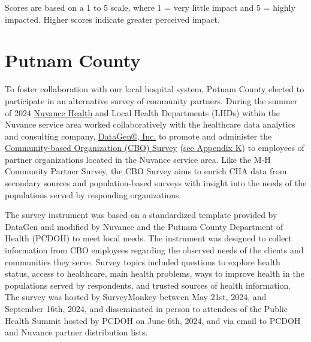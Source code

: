 \documentclass[
  english,
  letterpaper,
]{report}
\begin{document}
\begin{tcolorbox}[enhanced jigsaw, breakable, leftrule=.75mm, title=\textcolor{quarto-callout-note-color}{\faInfo}\hspace{0.5em}{Note}, bottomrule=.15mm, opacityback=0, left=2mm, colback=white, bottomtitle=1mm, coltitle=black, colbacktitle=quarto-callout-note-color!10!white, colframe=quarto-callout-note-color-frame, opacitybacktitle=0.6, toptitle=1mm, titlerule=0mm, arc=.35mm, rightrule=.15mm, toprule=.15mm]

Scores are based on a 1 to 5 scale, where 1 = very little impact and 5 =
highly impacted. Higher scores indicate greater perceived impact.

\end{tcolorbox}

\section{Putnam County}\label{putnam-county-2}

To foster collaboration with our local hospital system, Putnam County
elected to participate in an alternative survey of community partners.
During the summer of 2024 \href{https://www.nuvancehealth.org/}{Nuvance
Health} and Local Health Departments (LHDs) within the Nuvance service
area worked collaboratively with the healthcare data analytics and
consulting company, \href{https://datagen.info/}{DataGen®, Inc.} to
promote and administer the
\href{https://www.putnamcountyny.gov/images/Departments/Department_of_Health/PDF_Documents/CBO_survey_report_DataGen_Putnam.pdf}{Community-based
Organization (CBO) Survey}
(\hyperref[sec-appendix-k-putnam-nuvance-cbo-survey]{see Appendix K}) to
employees of partner organizations located in the Nuvance service area.
Like the M-H Community Partner Survey, the CBO Survey aims to enrich CHA
data from secondary sources and population-based surveys with insight
into the needs of the populations served by responding organizations.

The survey instrument was based on a standardized template provided by
DataGen and modified by Nuvance and the Putnam County Department of
Health (PCDOH) to meet local needs. The instrument was designed to
collect information from CBO employees regarding the observed needs of
the clients and communities they serve. Survey topics included questions
to explore health status, access to healthcare, main health problems,
ways to improve health in the populations served by respondents, and
trusted sources of health information. The survey was hosted by
SurveyMonkey between May 21st, 2024, and September 16th, 2024, and
disseminated in person to attendees of the Public Health Summit hosted
by PCDOH on June 6th, 2024, and via email to PCDOH and Nuvance partner
distribution lists.
\end{document}
